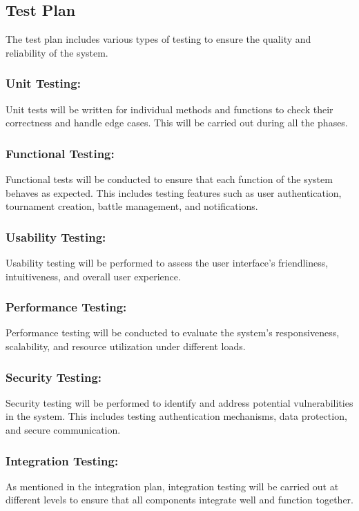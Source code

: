\documentclass{article}
\begin{document}
\subsection{Test Plan}

The test plan includes various types of testing to ensure the quality and reliability of the system.

\subsubsection*{Unit Testing:}
Unit tests will be written for individual methods and functions to check their correctness and handle edge cases. This will be carried out during all the phases.

\subsubsection*{Functional Testing:}
Functional tests will be conducted to ensure that each function of the system behaves as expected. This includes testing features such as user authentication, tournament creation, battle management, and notifications.

\subsubsection*{Usability Testing:}
Usability testing will be performed to assess the user interface's friendliness, intuitiveness, and overall user experience.

\subsubsection*{Performance Testing:}
Performance testing will be conducted to evaluate the system's responsiveness, scalability, and resource utilization under different loads.

\subsubsection*{Security Testing:}
Security testing will be performed to identify and address potential vulnerabilities in the system. This includes testing authentication mechanisms, data protection, and secure communication.

\subsubsection*{Integration Testing:}
As mentioned in the integration plan, integration testing will be carried out at different levels to ensure that all components integrate well and function together.
\end{document}
